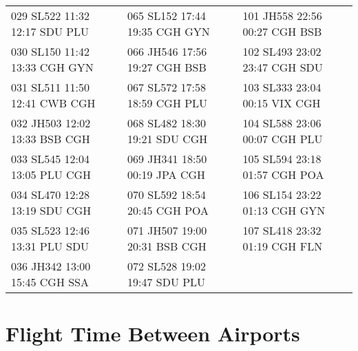 \documentclass{endm}
\begin{document}
\begin{center}
\begin{longtable}{lll}
\scriptsize  029 SL522 11:32 12:17 SDU PLU   & \scriptsize 065 SL152 17:44 19:35 CGH GYN   &   \scriptsize 101 JH558 22:56 00:27 CGH BSB\\
\scriptsize  030 SL150 11:42 13:33 CGH GYN  & \scriptsize066 JH546 17:56 19:27 CGH BSB   &   \scriptsize   102 SL493 23:02 23:47 CGH SDU\\
\scriptsize  031 SL511 11:50 12:41 CWB CGH  & \scriptsize067 SL572 17:58 18:59 CGH PLU  &   \scriptsize  103 SL333 23:04 00:15 VIX CGH\\
\scriptsize  032 JH503 12:02 13:33 BSB CGH    & \scriptsize068 SL482 18:30 19:21 SDU CGH &  \scriptsize  104 SL588 23:06 00:07 CGH PLU\\
\scriptsize  033 SL545 12:04 13:05 PLU CGH   & \scriptsize069 JH341 18:50 00:19 JPA CGH  &   \scriptsize   105 SL594 23:18 01:57 CGH POA\\
\scriptsize  034 SL470 12:28 13:19 SDU CGH  & \scriptsize070 SL592 18:54 20:45 CGH POA  &  \scriptsize   106 SL154 23:22 01:13 CGH GYN \\
\scriptsize  035 SL523 12:46 13:31 PLU SDU   & \scriptsize071 JH507 19:00 20:31 BSB CGH  &   \scriptsize   107 SL418 23:32 01:19 CGH FLN\\
\scriptsize  036 JH342 13:00 15:45 CGH SSA & \scriptsize 072 SL528 19:02 19:47 SDU PLU & \\

\end{longtable}

\end{center}

\newpage
\section{Flight Time Between Airports}
\end{document}
